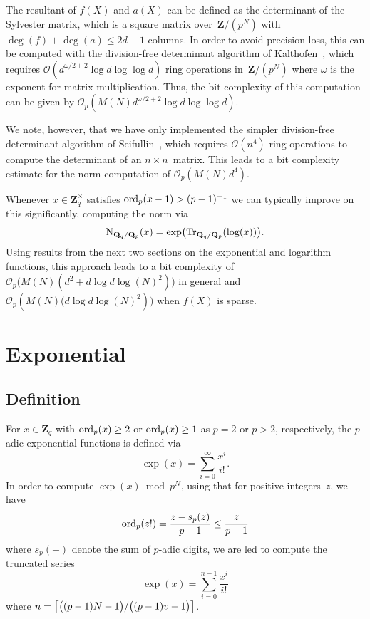 The resultant of $f(X)$ and $a(X)$ can be defined as the 
determinant of the Sylvester matrix, which is a square matrix 
over~$\mathbf{Z} / (p^N)$ with $\deg(f) + \deg(a) \leq 2d - 1$ columns. 
In order to avoid precision loss, this can be computed with the division-free 
determinant algorithm of Kalthofen~\citep{Kalthofen1992}, which requires 
$\mathcal{O}(d^{\omega/2 + 2} \log d \log \log d)$ ring operations 
in~$\mathbf{Z} / (p^N)$ where $\omega$ is the exponent for matrix multiplication.
Thus, the bit complexity of this computation can be given by 
$\mathcal{O}_p(M(N) d^{\omega/2 + 2} \log d \log \log d)$.

We note, however, that we have only implemented the simpler division-free 
determinant algorithm of Seifullin~\citep[Algorithm~4.2]{Seifullin2002}, 
which requires $\mathcal{O}(n^4)$ ring operations to compute the 
determinant of an $n \times n$~matrix.  This leads to a bit complexity 
estimate for the norm computation of $\mathcal{O}_p(M(N) d^4)$.

Whenever $x \in \mathbf{Z}_q^{\times}$ satisfies $\operatorname{ord}_p(x-1) > (p-1)^{-1}$ 
we can typically improve on this significantly, computing the norm via
\begin{equation}
\operatorname{N}_{\mathbf{Q}_q / \mathbf{Q}_p} (x) 
= \exp \bigl(\operatorname{Tr}_{\mathbf{Q}_q / \mathbf{Q}_p} (\log (x))\bigr).
\end{equation}
Using results from the next two sections on the exponential and logarithm 
functions, this approach leads to a bit complexity of 
$\mathcal{O}_p \bigl(M(N) (d^2 + d \log d \log(N)^2)\bigr)$ in general and 
$\mathcal{O}_p(M(N) \bigl(d \log d \log(N)^2)\bigr)$ when $f(X)$ is sparse.

\section{Exponential}

\subsection{Definition}

For $x \in \mathbf{Z}_q$ with $\operatorname{ord}_p(x) \geq 2$ or $\operatorname{ord}_p(x) \geq 1$ 
as $p=2$ or $p > 2$, respectively, the $p$-adic exponential functions is 
defined via 
\begin{equation}
\exp(x) = \sum_{i = 0}^{\infty} \frac{x^i}{i!}.
\end{equation}
In order to compute $\exp(x) \bmod{p^N}$, using that for positive 
integers~$z$, we have
\begin{equation}
\operatorname{ord}_p(z!) = \frac{z - s_p(z)}{p - 1} \leq \frac{z}{p - 1}
\end{equation}
where $s_p(-)$ denote the sum of $p$-adic digits, we are led to compute 
the truncated series 
\begin{equation}
\exp(x) = \sum_{i = 0}^{n-1} \frac{x^i}{i!}
\end{equation}
where $n = \bigl\lceil\bigl( (p-1)N - 1 \bigr) / \bigl( (p-1)v - 1 \bigr)\bigr\rceil$.

